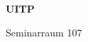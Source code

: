 \documentclass[a4paper]{article}
\begin{document}
\printGenericVSLHeader
\begin{center}
\begin{vsltext}{3cm}{4cm}

   \vspace{0.5cm} 

    \textbf{UITP} 

    \vspace{1.5cm}

    Seminarraum 107

\end{vsltext}

\end{center}
\end{document}

